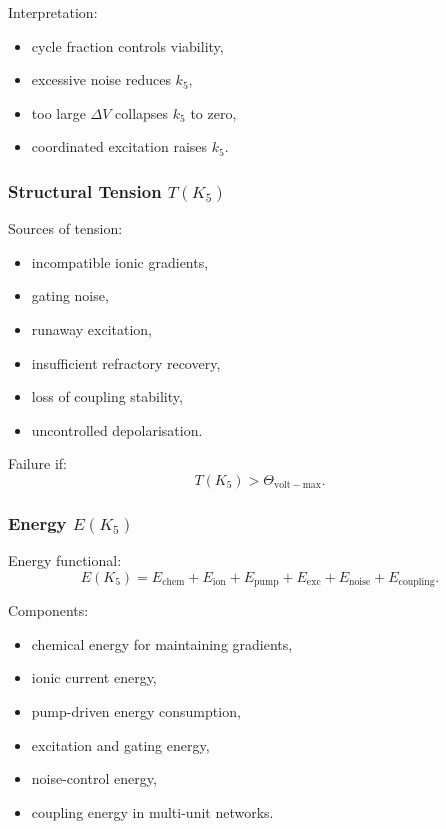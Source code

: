 Interpretation:
\begin{itemize}
    \item cycle fraction controls viability,
    \item excessive noise reduces $k_5$,
    \item too large $\Delta V$ collapses $k_5$ to zero,
    \item coordinated excitation raises $k_5$.
\end{itemize}

\subsubsection{Structural Tension \texorpdfstring{$T(K_5)$}{T(K_5)}}

Sources of tension:
\begin{itemize}
    \item incompatible ionic gradients,
    \item gating noise,
    \item runaway excitation,
    \item insufficient refractory recovery,
    \item loss of coupling stability,
    \item uncontrolled depolarisation.
\end{itemize}

Failure if:
\[
T(K_5) > \Theta_{\mathrm{volt-max}}.
\]

\subsubsection{Energy \texorpdfstring{$E(K_5)$}{E(K_5)}}

Energy functional:
\[
E(K_5)
= E_{\mathrm{chem}}
+ E_{\mathrm{ion}}
+ E_{\mathrm{pump}}
+ E_{\mathrm{exc}}
+ E_{\mathrm{noise}}
+ E_{\mathrm{coupling}}.
\]

Components:
\begin{itemize}
    \item chemical energy for maintaining gradients,
    \item ionic current energy,
    \item pump-driven energy consumption,
    \item excitation and gating energy,
    \item noise-control energy,
    \item coupling energy in multi-unit networks.
\end{itemize}

